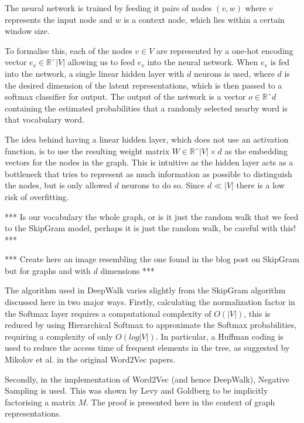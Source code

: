 \documentclass[a4paper]{article}
\begin{document}
The neural network is trained by feeding it pairs of nodes $(v, w)$ where $v$
represents the input node and $w$ is a context node, which lies within a certain
window size.

To formalise this, each of the nodes $v \in V$ are represented by a one-hot
encoding vector $e_v \in \mathbb{R}ˆ|V|$ allowing us to feed $e_v$ into the
neural network. When $e_v$ is fed into the network, a single linear hidden layer with
$d$ neurons is used, where $d$ is the desired dimension of the latent
representations, which is then passed to a softmax classifier for output. The
output of the network is a vector $o \in \mathbb{R}ˆd$ containing the estimated
probabilities that a randomly selected nearby word is that vocabulary word.

The idea behind having a linear hidden layer, which does not use an activation
function, is to use the resulting weight matrix $W \in \mathbb{R}ˆ{|V| \times
  d}$ as the embedding vectors for the nodes in the graph. This is intuitive as
the hidden layer acts as a bottleneck that tries to represent as much
information as possible to distinguish the nodes, but is only allowed $d$
neurons to do so. Since $d \ll |V|$ there is a low risk of overfitting.

*** Is our vocabulary the whole graph, or is it just the random walk that we
feed to the SkipGram model, perhaps it is just the random walk, be careful with
this! ***

*** Create here an image resembling the one found in the blog post on SkipGram
but for graphs and with $d$ dimensions ***

The algorithm used in DeepWalk varies slightly from the SkipGram algorithm
discussed here in two major ways. Firstly, calculating the normalization factor
in the Softmax layer requires a computational complexity of $O(|V|)$, this is
reduced by using Hierarchical Softmax to approximate the Softmax probabilities,
requiring a complexity of only $O(log|V|)$. In particular, a Huffman coding is
used to reduce the access time of frequent elements in the tree, as suggested by
Mikolov et al. in the original Word2Vec
papers.\cite{mikolov2013distributed,mikolov2013efficient}

Secondly, in the implementation of Word2Vec (and hence DeepWalk), Negative
Sampling is used.\cite{mikolov2013distributed} This was shown by Levy and
Goldberg\cite{levy&goldberg} to be implicitly factorising a matrix $M$. The
proof is presented here in the context of graph representations.
\end{document}
